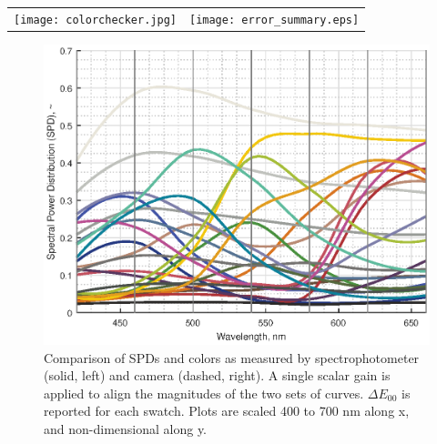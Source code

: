\documentclass[twocolumn,10pt]{asme2ej}
\begin{document}
%


\clearpage

\onecolumn

\begin{table}[H]
\centering
\begin{tabular}{cc}
\texttt{[image: colorchecker.jpg]} & \texttt{[image: error\_summary.eps]} \\
\end{tabular}
\label{colorchecker}
\end{table}


\begin{figure}[H]
\begin{centering}
  \includegraphics[height=0.60\linewidth]{colorchecker_SPDs.eps}
    \caption{Comparison of SPDs and colors as measured by spectrophotometer (solid, left) and camera (dashed, right). A single scalar gain is applied to align the magnitudes of the two sets of curves. $\Delta E_{00}$ is reported for each swatch. Plots are scaled 400 to 700 nm along x, and non-dimensional along y.}
  \label{colorchecker_SPDs}
    \end{centering}
\end{figure}
\end{document}
